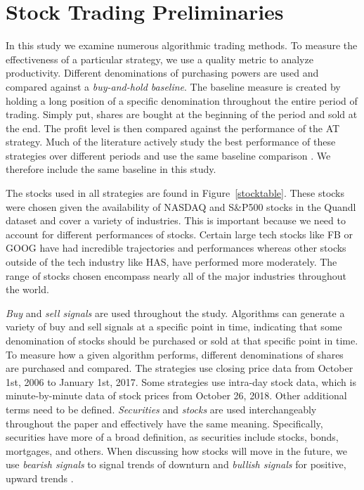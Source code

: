 \documentclass[../thesis.tex]{subfiles}
\begin{document}
\chapter{Stock Trading Preliminaries}
\label{ch:prelim}

In this study we examine numerous algorithmic trading methods. To measure the effectiveness of a particular strategy, we use a quality metric to analyze productivity. Different denominations of purchasing powers are used and compared against a \textit {buy-and-hold baseline}. The baseline measure is created by holding a long position of a specific denomination throughout the entire period of trading. Simply put, shares are bought at the beginning of the period and sold at the end. The profit level is then compared against the performance of the AT strategy. Much of the literature actively study the best performance of these strategies over different periods and use the same baseline comparison \cite{Liu2006} \cite{Aldridge2010} \cite{Garcia2015}. We therefore include the same baseline in this study.

The stocks used in all strategies are found in Figure~\ref{stocktable}. These stocks were chosen given the availability of NASDAQ and S\&P500 stocks in the Quandl dataset and cover a variety of industries. This is important because we need to account for different performances of stocks. Certain large tech stocks like FB or GOOG have had incredible trajectories and performances whereas other stocks outside of the tech industry like HAS, have performed more moderately. The range of stocks chosen encompass nearly all of the major industries throughout the world.

\textit {Buy} and \textit {sell signals} are used throughout the study. Algorithms can generate a variety of buy and sell signals at a specific point in time, indicating that some denomination of stocks should be purchased or sold at that specific point in time. To measure how a given algorithm performs, different denominations of shares are purchased and compared. The strategies use closing price data from October 1st, 2006 to January 1st, 2017. Some strategies use intra-day stock data, which is minute-by-minute data of stock prices from October 26, 2018. Other additional terms need to be defined. \textit {Securities} and \textit{stocks} are used interchangeably throughout the paper and effectively have the same meaning. Specifically, securities have more of a broad definition, as securities include stocks, bonds, mortgages, and others. When discussing how stocks will move in the future, we use \textit {bearish signals} to signal trends of downturn and \textit {bullish signals} for positive, upward trends \cite{Aldridge2010}. 
\end{document}
